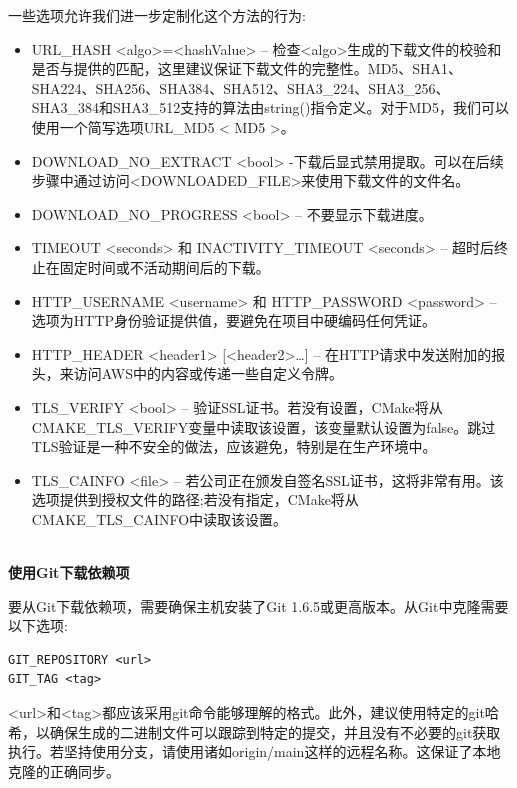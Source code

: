 一些选项允许我们进一步定制化这个方法的行为:

\begin{itemize}
\item 
URL\_HASH <algo>=<hashValue> – 检查<algo>生成的下载文件的校验和是否与提供的匹配，这里建议保证下载文件的完整性。MD5、SHA1、SHA224、SHA256、SHA384、SHA512、SHA3\_224、SHA3\_256、SHA3\_384和SHA3\_512支持的算法由string()指令定义。对于MD5，我们可以使用一个简写选项URL\_MD5 < MD5 >。

\item 
DOWNLOAD\_NO\_EXTRACT <bool> -下载后显式禁用提取。可以在后续步骤中通过访问<DOWNLOADED\_FILE>来使用下载文件的文件名。

\item 
DOWNLOAD\_NO\_PROGRESS <bool> – 不要显示下载进度。

\item 
TIMEOUT <seconds> 和 INACTIVITY\_TIMEOUT <seconds> – 超时后终止在固定时间或不活动期间后的下载。

\item 
HTTP\_USERNAME <username> 和 HTTP\_PASSWORD <password> – 选项为HTTP身份验证提供值，要避免在项目中硬编码任何凭证。

\item 
HTTP\_HEADER <header1> [<header2>…] – 在HTTP请求中发送附加的报头，来访问AWS中的内容或传递一些自定义令牌。

\item 
TLS\_VERIFY <bool> – 验证SSL证书。若没有设置，CMake将从CMAKE\_TLS\_VERIFY变量中读取该设置，该变量默认设置为false。跳过TLS验证是一种不安全的做法，应该避免，特别是在生产环境中。

\item 
TLS\_CAINFO <file> – 若公司正在颁发自签名SSL证书，这将非常有用。该选项提供到授权文件的路径;若没有指定，CMake将从CMAKE\_TLS\_CAINFO中读取该设置。
\end{itemize}

\hspace*{\fill} \\ %
\noindent
\textbf{使用Git下载依赖项}

要从Git下载依赖项，需要确保主机安装了Git 1.6.5或更高版本。从Git中克隆需要以下选项:

\begin{lstlisting}[style=styleCMake]
GIT_REPOSITORY <url>
GIT_TAG <tag>
\end{lstlisting} 

<url>和<tag>都应该采用git命令能够理解的格式。此外，建议使用特定的git哈希，以确保生成的二进制文件可以跟踪到特定的提交，并且没有不必要的git获取执行。若坚持使用分支，请使用诸如origin/main这样的远程名称。这保证了本地克隆的正确同步。

